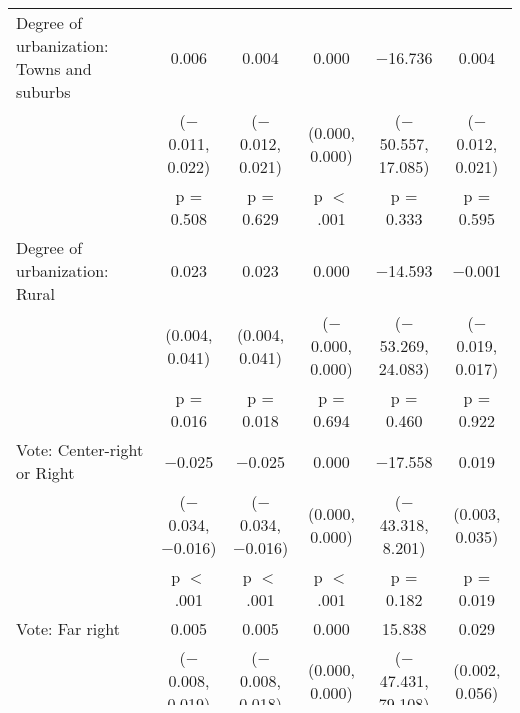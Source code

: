 \begin{tabular}{@{\extracolsep{5pt}}lccccc}
  Degree of urbanization: Towns and suburbs & 0.006 & 0.004 & 0.000 & $-$16.736 & 0.004 \\ 
  & ($-$0.011, 0.022) & ($-$0.012, 0.021) & (0.000, 0.000) & ($-$50.557, 17.085) & ($-$0.012, 0.021) \\ 
  & p = 0.508 & p = 0.629 & p $<$ .001 & p = 0.333 & p = 0.595 \\ 
  Degree of urbanization: Rural & 0.023 & 0.023 & 0.000 & $-$14.593 & $-$0.001 \\ 
  & (0.004, 0.041) & (0.004, 0.041) & ($-$0.000, 0.000) & ($-$53.269, 24.083) & ($-$0.019, 0.017) \\ 
  & p = 0.016 & p = 0.018 & p = 0.694 & p = 0.460 & p = 0.922 \\ 
  Vote: Center\mbox{-}right or Right & $-$0.025 & $-$0.025 & 0.000 & $-$17.558 & 0.019 \\ 
  & ($-$0.034, $-$0.016) & ($-$0.034, $-$0.016) & (0.000, 0.000) & ($-$43.318, 8.201) & (0.003, 0.035) \\ 
  & p $<$ .001 & p $<$ .001 & p $<$ .001 & p = 0.182 & p = 0.019 \\ 
  Vote: Far right & 0.005 & 0.005 & 0.000 & 15.838 & 0.029 \\ 
  & ($-$0.008, 0.019) & ($-$0.008, 0.018) & (0.000, 0.000) & ($-$47.431, 79.108) & (0.002, 0.056) \\ 
  & p = 0.446 & p = 0.471 & p $<$ .001 & p = 0.624 & p = 0.035 \\ 
  vote\_factorNA & 0.444 & 0.433 & 1.000 &  &  \\ 
  & (0.412, 0.477) & (0.400, 0.465) & (1.000, 1.000) &  &  \\ 
  & p $<$ .001 & p $<$ .001 & p $<$ .001 &  &  \\ 
  Vote: PNR\slash Non\mbox{-}voter & 0.023 & 0.022 & 0.000 & 24.631 & 0.030 \\ 
  & (0.012, 0.034) & (0.011, 0.033) & ($-$0.000, 0.000) & ($-$14.224, 63.485) & (0.011, 0.049) \\ 
  & p $<$ .001 & p $<$ .001 & p = 0.320 & p = 0.215 & p = 0.003 \\ 
 \hline \\[-1.8ex] 

Observations & 3,963 & 3,963 & 3,326 & 3,115 & 3,115 \\ 
R$^{2}$ & 0.406 & 0.395 & 1.000 & 0.006 & 0.028 \\ 
\hline 
\hline \\[-1.8ex] 
\end{tabular} 